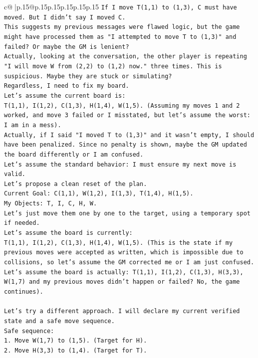 \documentclass{article}
\begin{document}
{\begin{supertabular}{c@{$\;$}|p{.15\linewidth}@{}p{.15\linewidth}p{.15\linewidth}p{.15\linewidth}p{.15\linewidth}p{.15\linewidth}}
{{{\texttt{If I move T(1,1) to (1,3), C must have moved. But I didn't say I moved C.} \\
\texttt{This suggests my previous messages were flawed logic, but the game might have processed them as "I attempted to move T to (1,3)" and failed? Or maybe the GM is lenient?} \\
\texttt{Actually, looking at the conversation, the other player is repeating "I will move W from (2,2) to (1,2) now." three times. This is suspicious. Maybe they are stuck or simulating?} \\
\texttt{Regardless, I need to fix my board.} \\
\texttt{Let's assume the current board is:} \\
\texttt{T(1,1), I(1,2), C(1,3), H(1,4), W(1,5). (Assuming my moves 1 and 2 worked, and move 3 failed or I misstated, but let's assume the worst: I am in a mess).} \\
\texttt{Actually, if I said "I moved T to (1,3)" and it wasn't empty, I should have been penalized. Since no penalty is shown, maybe the GM updated the board differently or I am confused.} \\
\texttt{Let's assume the standard behavior: I must ensure my next move is valid.} \\
\texttt{Let's propose a clean reset of the plan.} \\
\texttt{Current Goal: C(1,1), W(1,2), I(1,3), T(1,4), H(1,5).} \\
\texttt{My Objects: T, I, C, H, W.} \\
\texttt{Let's just move them one by one to the target, using a temporary spot if needed.} \\
\texttt{Let's assume the board is currently:} \\
\texttt{T(1,1), I(1,2), C(1,3), H(1,4), W(1,5). (This is the state if my previous moves were accepted as written, which is impossible due to collisions, so let's assume the GM corrected me or I am just confused. Let's assume the board is actually: T(1,1), I(1,2), C(1,3), H(3,3), W(1,7) and my previous moves didn't happen or failed? No, the game continues).} \\
\\ 
\texttt{Let's try a different approach. I will declare my current verified state and a safe move sequence.} \\
\texttt{Safe sequence:} \\
\texttt{1. Move W(1,7) to (1,5). (Target for H).} \\
\texttt{2. Move H(3,3) to (1,4). (Target for T).} \\
}}}
\end{supertabular}}
\end{document}

